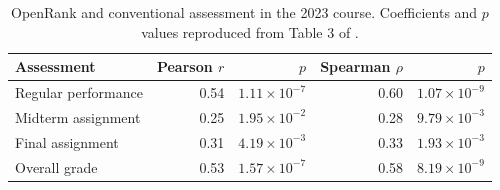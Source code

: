 \begin{table}[htbp]
\caption{OpenRank and conventional assessment in the 2023 course. Coefficients and $p$ values reproduced from Table 3 of \citet{wang2024course}.}
\label{tab:ch7-legacy}
\small\renewcommand{\arraystretch}{1.18}\setlength{\tabcolsep}{4pt}
\begin{tabularx}{\linewidth}{@{}>{\raggedright\arraybackslash}Xrrrr@{}}\toprule
Assessment & Pearson $r$ & $p$ & Spearman $\rho$ & $p$\\\midrule
Regular performance & 0.54 & $1.11\!\times\!10^{-7}$ & 0.60 & $1.07\!\times\!10^{-9}$\\
Midterm assignment & 0.25 & $1.95\!\times\!10^{-2}$ & 0.28 & $9.79\!\times\!10^{-3}$\\
Final assignment & 0.31 & $4.19\!\times\!10^{-3}$ & 0.33 & $1.93\!\times\!10^{-3}$\\
Overall grade & 0.53 & $1.57\!\times\!10^{-7}$ & 0.58 & $8.19\!\times\!10^{-9}$\\\bottomrule
\end{tabularx}
\end{table}
